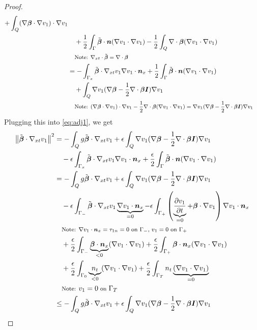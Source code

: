 \documentclass[Dissertation.tex]{subfiles}
\begin{document}
\begin{proof}
\begin{align*}
+\int_Q(\Grad\bfbeta\cdot\Grad v_1)\cdot\Grad v_1
\\&\quad
+\frac{1}{2}\int_\Gamma\tilde\bfbeta\cdot\bfn(\Grad v_1\cdot\Grad v_1)
-\frac{1}{2}\int_Q\Div\bfbeta(\Grad v_1\cdot\Grad v_1)\\
&\quad\footnotesize{\text{Note: }\Divxt\tilde\bfbeta=\Div\bfbeta}
\\
%
&=-\int_{\Gamma_x}\tilde\bfbeta\cdot\Gradxt v_1\Grad v_1\cdot\bfn_x
+\frac{1}{2}\int_\Gamma\tilde\bfbeta\cdot\bfn(\Grad v_1\cdot\Grad v_1)
\\&\quad
+\int_Q\Grad v_1(\Grad\bfbeta-\frac{1}{2}\Div\bfbeta\bfI)\Grad v_1\\
&\quad\footnotesize{\text{Note: }(\Grad\bfbeta\cdot\Grad v_1)\cdot\Grad v_1-\frac{1}{2}\Div\bfbeta(\Grad v_1\cdot\Grad v_1)=\Grad v_1(\Grad\bfbeta-\frac{1}{2}\Div\bfbeta\bfI)\Grad v_1}
\\
\end{align*}
Plugging this into \eqref{eq:adj1}, we get
\begin{align*}
\norm{\tilde\bfbeta\cdot\Gradxt v_1}^2
&=-\int_Q g\tilde\bfbeta\cdot\Gradxt v_1
+\epsilon\int_Q\Grad v_1(\Grad\bfbeta-\frac{1}{2}\Div\bfbeta\bfI)\Grad v_1\\
&\quad-\epsilon\int_{\Gamma_x}\tilde\bfbeta\cdot\Gradxt v_1\Grad v_1\cdot\bfn_x
+\frac{\epsilon}{2}\int_\Gamma\tilde\bfbeta\cdot\bfn(\Grad v_1\cdot\Grad v_1)\\
%
&=-\int_Q g\tilde\bfbeta\cdot\Gradxt v_1
+\epsilon\int_Q\Grad v_1(\Grad\bfbeta-\frac{1}{2}\Div\bfbeta\bfI)\Grad v_1\\
&\quad
-\epsilon\int_{\Gamma_-}\tilde\bfbeta\cdot\Gradxt v_1\underbrace{\Grad v_1\cdot\bfn_x}_{=0}
-\epsilon\int_{\Gamma_+}\LRp{\underbrace{\pd{v_1}{t}}_{=0}+\bfbeta\cdot\Grad v_1}\Grad v_1\cdot\bfn_x\\
&\quad\footnotesize{\text{Note: }\Grad v_1\cdot\bfn_x=\tau_{1n}=0\text{ on }\Gamma_-\text{, }v_1=0\text{ on }\Gamma_+}
\\
&\quad
+\frac{\epsilon}{2}\int_{\Gamma_-}\underbrace{\bfbeta\cdot\bfn_x}_{<0}(\Grad v_1\cdot\Grad v_1)
+\frac{\epsilon}{2}\int_{\Gamma_+}\bfbeta\cdot\bfn_x(\Grad v_1\cdot\Grad v_1)\\
&\quad
+\frac{\epsilon}{2}\int_{\Gamma_0}\underbrace{n_t}_{<0}(\Grad v_1\cdot\Grad v_1)
+\frac{\epsilon}{2}\int_{\Gamma_T}n_t\underbrace{(\Grad v_1\cdot\Grad v_1)}_{=0}\\
&\quad\footnotesize{\text{Note: }v_1=0\text{ on }\Gamma_T}
\\
%
&\leq-\int_Q g\tilde\bfbeta\cdot\Gradxt v_1
+\epsilon\int_Q\Grad v_1(\Grad\bfbeta-\frac{1}{2}\Div\bfbeta\bfI)\Grad v_1\\

\end{align*}
\end{proof}
\end{document}
